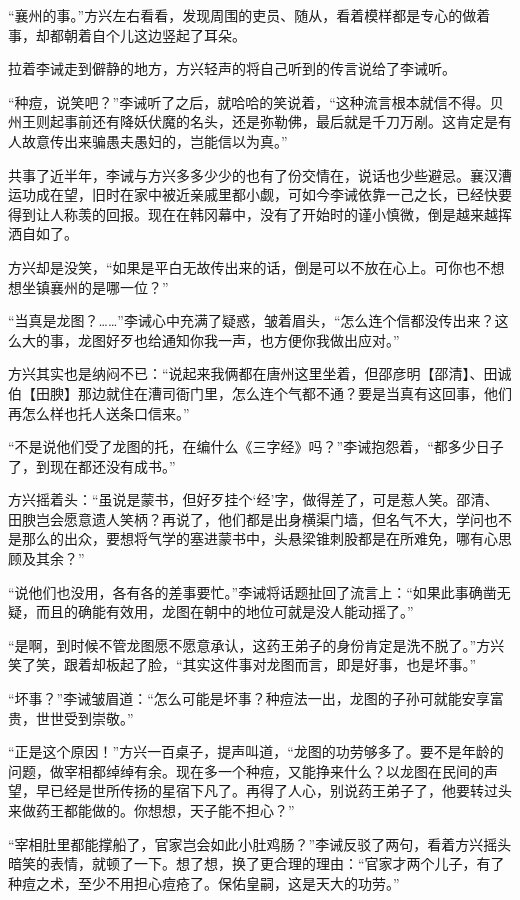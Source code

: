 “襄州的事。”方兴左右看看，发现周围的吏员、随从，看着模样都是专心的做着事，却都朝着自个儿这边竖起了耳朵。

拉着李诫走到僻静的地方，方兴轻声的将自己听到的传言说给了李诫听。

“种痘，说笑吧？”李诫听了之后，就哈哈的笑说着，“这种流言根本就信不得。贝州王则起事前还有降妖伏魔的名头，还是弥勒佛，最后就是千刀万剐。这肯定是有人故意传出来骗愚夫愚妇的，岂能信以为真。”

共事了近半年，李诫与方兴多多少少的也有了份交情在，说话也少些避忌。襄汉漕运功成在望，旧时在家中被近亲戚里都小觑，可如今李诫依靠一己之长，已经快要得到让人称羡的回报。现在在韩冈幕中，没有了开始时的谨小慎微，倒是越来越挥洒自如了。

方兴却是没笑，“如果是平白无故传出来的话，倒是可以不放在心上。可你也不想想坐镇襄州的是哪一位？”

“当真是龙图？……”李诫心中充满了疑惑，皱着眉头，“怎么连个信都没传出来？这么大的事，龙图好歹也给通知你我一声，也方便你我做出应对。”

方兴其实也是纳闷不已：“说起来我俩都在唐州这里坐着，但邵彦明【邵清】、田诚伯【田腴】那边就住在漕司衙门里，怎么连个气都不通？要是当真有这回事，他们再怎么样也托人送条口信来。”

“不是说他们受了龙图的托，在编什么《三字经》吗？”李诫抱怨着，“都多少日子了，到现在都还没有成书。”

方兴摇着头：“虽说是蒙书，但好歹挂个‘经’字，做得差了，可是惹人笑。邵清、田腴岂会愿意遗人笑柄？再说了，他们都是出身横渠门墙，但名气不大，学问也不是那么的出众，要想将气学的塞进蒙书中，头悬梁锥刺股都是在所难免，哪有心思顾及其余？”

“说他们也没用，各有各的差事要忙。”李诫将话题扯回了流言上：“如果此事确凿无疑，而且的确能有效用，龙图在朝中的地位可就是没人能动摇了。”

“是啊，到时候不管龙图愿不愿意承认，这药王弟子的身份肯定是洗不脱了。”方兴笑了笑，跟着却板起了脸，“其实这件事对龙图而言，即是好事，也是坏事。”

“坏事？”李诫皱眉道：“怎么可能是坏事？种痘法一出，龙图的子孙可就能安享富贵，世世受到崇敬。”

“正是这个原因！”方兴一百桌子，提声叫道，“龙图的功劳够多了。要不是年龄的问题，做宰相都绰绰有余。现在多一个种痘，又能挣来什么？以龙图在民间的声望，早已经是世所传扬的星宿下凡了。再得了人心，别说药王弟子了，他要转过头来做药王都能做的。你想想，天子能不担心？”

“宰相肚里都能撑船了，官家岂会如此小肚鸡肠？”李诫反驳了两句，看着方兴摇头暗笑的表情，就顿了一下。想了想，换了更合理的理由：“官家才两个儿子，有了种痘之术，至少不用担心痘疮了。保佑皇嗣，这是天大的功劳。”

